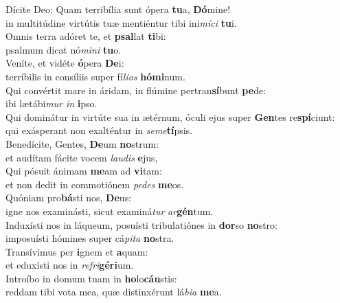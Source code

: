 \evenverse Dícite Deo: Quam terribília sunt ópera \textbf{tu}a, \textbf{Dó}mine!~\*\\
\evenverse in multitúdine virtútis tuæ mentiéntur tibi ini\textit{mí}\textit{ci} \textbf{tu}i.\\
\oddverse Omnis terra adóret te, et \textbf{psal}lat \textbf{ti}bi:~\*\\
\oddverse psalmum dicat nó\textit{mi}\textit{ni} \textbf{tu}o.\\
\evenverse Veníte, et vidéte \textbf{ó}pera \textbf{De}i:~\*\\
\evenverse terríbilis in consíliis super fí\textit{li}\textit{os} \textbf{hó}\textbf{mi}num.\\
\oddverse Qui convértit mare in áridam, in flúmine pertran\textbf{sí}bunt \textbf{pe}de:~\*\\
\oddverse ibi lætábi\textit{mur} \textit{in} \textbf{i}pso.\\
\evenverse Qui dominátur in virtúte sua in ætérnum, óculi ejus super \textbf{Gen}tes re\textbf{spí}ciunt:~\*\\
\evenverse qui exásperant non exalténtur in \textit{se}\textit{me}\textbf{tí}psis.\\
\oddverse Benedícite, Gentes, \textbf{De}um \textbf{no}strum:~\*\\
\oddverse et audítam fácite vocem \textit{lau}\textit{dis} \textbf{e}jus,\\
\evenverse Qui pósuit ánimam \textbf{me}am ad \textbf{vi}tam:~\*\\
\evenverse et non dedit in commotiónem \textit{pe}\textit{des} \textbf{me}os.\\
\oddverse Quóniam pro\textbf{bá}sti nos, \textbf{De}us:~\*\\
\oddverse igne nos examinásti, sicut examiná\textit{tur} \textit{ar}\textbf{gén}tum.\\
\evenverse Induxísti nos in láqueum, posuísti tribulatiónes in \textbf{dor}so \textbf{no}stro:~\*\\
\evenverse imposuísti hómines super cá\textit{pi}\textit{ta} \textbf{no}stra.\\
\oddverse Transívimus per \textbf{i}gnem et \textbf{a}quam:~\*\\
\oddverse et eduxísti nos in \textit{re}\textit{fri}\textbf{gé}\textbf{ri}um.\\
\evenverse Introíbo in domum tuam in \textbf{ho}lo\textbf{cáu}stis:~\*\\
\evenverse reddam tibi vota mea, quæ distinxérunt lá\textit{bi}\textit{a} \textbf{me}a.\\
